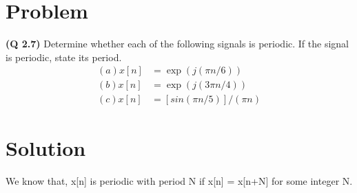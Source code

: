 \documentclass[journal,12pt,twocolumn]{IEEEtran}
\begin{document}
\section*{\textbf{Problem}}
\textbf{(Q 2.7)} Determine whether each of the following signals is periodic. If the signal is periodic, state its period.
\begin{align*}
(a) x[n] &= \exp(j(\pi n/6))\\
(b) x[n] &= \exp(j(3\pi n/4))\\
(c) x[n] &= [sin(\pi n/5)]/(\pi n)
\end{align*}
    
\section*{\textbf{Solution}}
We know that, x[n] is periodic with period N if x[n] = x[n+N] for some integer N.
\end{document}
